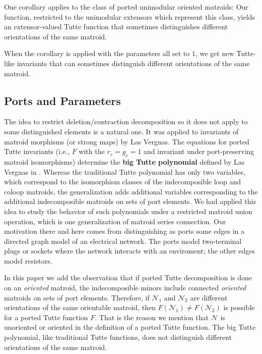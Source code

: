 \documentclass[12pt]{article}
\theoremstyle{definition}
\begin{document}
One corollary applies to the class of ported unimodular oriented
matroids:  Our function, restricted to the unimodular extensors
which represent this class, yields an extensor-valued Tutte function 
that sometimes distinguishes different orientations of the same 
matroid.

When the corollary is applied with the
parameters all set to $1$, we get new Tutte-like invariants
that can sometimes distinguish different orientations of the same matroid.

\subsection{Ports and Parameters}

The idea to restrict deletion/contraction decomposition so it does
not apply to some distinguished elements 
is a natural one.  It was applied to invariants of
matroid morphisms (or strong maps) by Las 
Vergnas\cite{MR0419272,SetPointedLV,EtienneLasVergnasMorphismVectorial}.
The equations for 
ported Tutte invariants (i.e., $F$ with the $r_e=g_e=1$ and 
invariant under port-preserving matroid isomorphisms) determine
the 
\textbf{big Tutte polynomial} defined by Las Vergnas in \cite{SetPointedLV}.
Whereas the traditional Tutte polynomial has only two variables,
which correspond to the isomorphism classes of the indecomposible 
loop and coloop matroids, the generalization adds additional
variables corresponding to the additional indecomposible matroids
on sets of port elements.  We had applied this idea to study the behavior
of such polynomials under a restricted matroid union 
operation\cite{sdcPorted}, which is one generalization of matroid
series connection.  Our motivation there and here
comes from distinguishing as ports some edges
in a directed graph model of an electrical network.  The ports
model two-terminal plugs or sockets where the network interacts
with an enviroment; the other edges model resistors.

In this paper we add the observation that if ported Tutte 
decomposition is done on an \emph{oriented} matroid, the indecomposible
minors include connected \emph{oriented} matroids on sets of port elements.
Therefore, if $\mathcal{N}_1$ and $\mathcal{N}_2$ are different orientations
of the same orientable matroid, then 
$F(\mathcal{N}_1)\neq F(\mathcal{N}_2)$ is possible for a ported
Tutte function $F$.  
That is the reason we mention that $\mathcal{N}$ is unoriented or
oriented in the definition of a ported Tutte function.
The big Tutte polynomial, like traditional
Tutte functions, does not 
distinguish different orientations of the same matroid.
\end{document}
